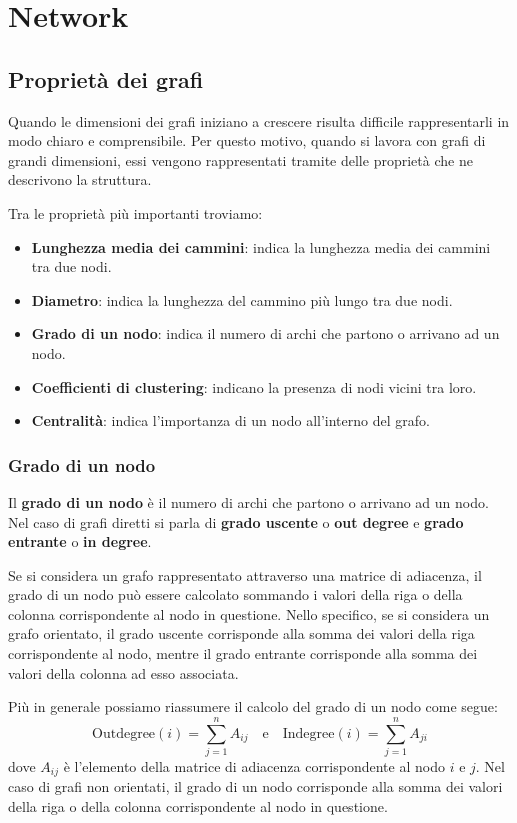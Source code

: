 \chapter{Network}
\section{Proprietà dei grafi}
Quando le dimensioni dei grafi iniziano a crescere risulta difficile
rappresentarli in modo chiaro e comprensibile. Per questo motivo, quando si
lavora con grafi di grandi dimensioni, essi vengono rappresentati tramite
delle proprietà che ne descrivono la struttura.

Tra le proprietà più importanti troviamo:
\begin{itemize}
    \item \textbf{Lunghezza media dei cammini}: indica la lunghezza media dei
          cammini tra due nodi.
    \item \textbf{Diametro}: indica la lunghezza del cammino più lungo tra due
          nodi.
    \item \textbf{Grado di un nodo}: indica il numero di archi che partono o
          arrivano ad un nodo.
    \item \textbf{Coefficienti di clustering}: indicano la presenza di nodi
          vicini tra loro.
    \item \textbf{Centralità}: indica l'importanza di un nodo all'interno del
          grafo.
\end{itemize}
\subsection{Grado di un nodo}
\begin{definizione}
    Il \textbf{grado di un nodo} è il numero di archi che partono o arrivano ad
    un nodo. Nel caso di grafi diretti si parla di \textbf{grado uscente} o
    \textbf{out degree} e \textbf{grado entrante} o \textbf{in degree}.
\end{definizione}
Se si considera un grafo rappresentato attraverso una matrice di adiacenza, il
grado di un nodo può essere calcolato sommando i valori della riga o della
colonna corrispondente al nodo in questione. Nello specifico, se si considera
un grafo orientato, il grado uscente corrisponde alla somma dei valori della
riga corrispondente al nodo, mentre il grado entrante corrisponde alla somma dei
valori della colonna ad esso associata.

Più in generale possiamo riassumere il calcolo del grado di un nodo come segue:
\begin{equation}
    \text{Outdegree}(i) = \sum_{j=1}^{n} A_{ij} \quad \text{e} \quad
    \text{Indegree}(i) = \sum_{j=1}^{n} A_{ji}
\end{equation}
dove $A_{ij}$ è l'elemento della matrice di adiacenza corrispondente al nodo
$i$ e $j$. Nel caso di grafi non orientati, il grado di un nodo corrisponde
alla somma dei valori della riga o della colonna corrispondente al nodo in
questione.

